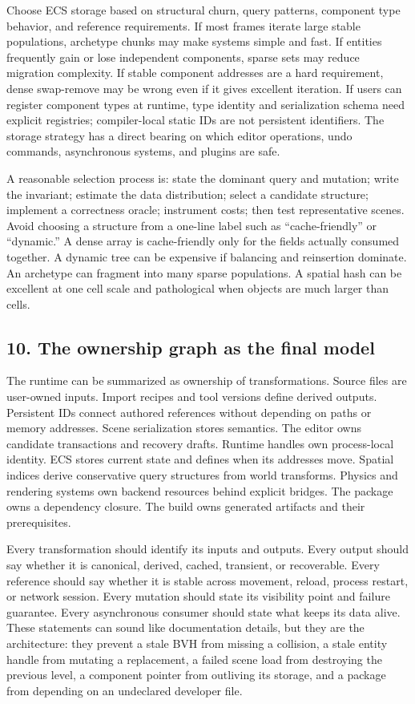 Choose ECS storage based on structural churn, query patterns, component type behavior, and reference requirements. If most frames iterate large stable populations, archetype chunks may make systems simple and fast. If entities frequently gain or lose independent components, sparse sets may reduce migration complexity. If stable component addresses are a hard requirement, dense swap-remove may be wrong even if it gives excellent iteration. If users can register component types at runtime, type identity and serialization schema need explicit registries; compiler-local static IDs are not persistent identifiers. The storage strategy has a direct bearing on which editor operations, undo commands, asynchronous systems, and plugins are safe.

A reasonable selection process is: state the dominant query and mutation; write the invariant; estimate the data distribution; select a candidate structure; implement a correctness oracle; instrument costs; then test representative scenes. Avoid choosing a structure from a one-line label such as ``cache-friendly'' or ``dynamic.'' A dense array is cache-friendly only for the fields actually consumed together. A dynamic tree can be expensive if balancing and reinsertion dominate. An archetype can fragment into many sparse populations. A spatial hash can be excellent at one cell scale and pathological when objects are much larger than cells.

\subsection{10. The ownership graph as the final model}\label{05-engine-i-ch008-the-ownership-graph-as-the-final-model}

The runtime can be summarized as ownership of transformations. Source files are user-owned inputs. Import recipes and tool versions define derived outputs. Persistent IDs connect authored references without depending on paths or memory addresses. Scene serialization stores semantics. The editor owns candidate transactions and recovery drafts. Runtime handles own process-local identity. ECS stores current state and defines when its addresses move. Spatial indices derive conservative query structures from world transforms. Physics and rendering systems own backend resources behind explicit bridges. The package owns a dependency closure. The build owns generated artifacts and their prerequisites.

Every transformation should identify its inputs and outputs. Every output should say whether it is canonical, derived, cached, transient, or recoverable. Every reference should say whether it is stable across movement, reload, process restart, or network session. Every mutation should state its visibility point and failure guarantee. Every asynchronous consumer should state what keeps its data alive. These statements can sound like documentation details, but they are the architecture: they prevent a stale BVH from missing a collision, a stale entity handle from mutating a replacement, a failed scene load from destroying the previous level, a component pointer from outliving its storage, and a package from depending on an undeclared developer file.

